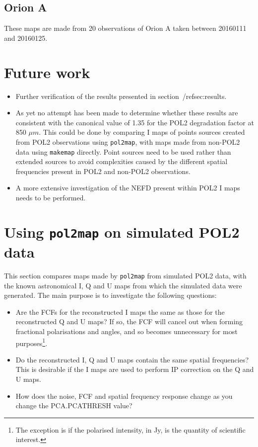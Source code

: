 \documentclass[twoside,11pt]{starlink}
\begin{document}
\subsection{Orion A}
These maps are made from 20 observations of Orion A taken between 20160111
and 20160125.










\section{Future work}

\begin{itemize}
\item Further verification of the results presented in section~/ref{sec:results}.
\item As yet no attempt has been made to determine whether these results are
consistent with the canonical value of 1.35 for the POL2 degradation factor at 850
$\mu m$. This could be done by comparing I maps of points sources
created from POL2 observations using \texttt{pol2map}, with maps made
from non-POL2 data using \texttt{makemap} directly. Point sources need to
be used rather than extended sources to avoid complexities caused by the
different spatial frequencies present in POL2 and non-POL2 observations.
\item A more extensive investigation of the NEFD present within POL2 I
maps needs to be performed.
\end{itemize}

\appendix
\section{Using \texttt{pol2map} on simulated POL2 data}

This section compares maps made by \texttt{pol2map} from simulated POL2
data, with the known astronomical I, Q and U maps from which the
simulated data were generated. The main purpose is to investigate the
following questions:

\begin{itemize}
\item Are the FCFs for the reconstructed I maps the same as those for the
reconstructed Q and U maps? If so, the FCF will cancel out when forming
fractional polarisations and angles, and so becomes unnecessary for most
purposes\footnote{The exception is if the polarised intensity, in Jy, is
the quantity of scientific interest.}.
\item Do the reconstructed I, Q and U maps contain the same spatial
frequencies? This is desirable if the I maps are used to perform IP
correction on the Q and U maps.
\item How does the noise, FCF and spatial frequency response change as you
change the PCA.PCATHRESH value?
\end{itemize}
\end{document}

